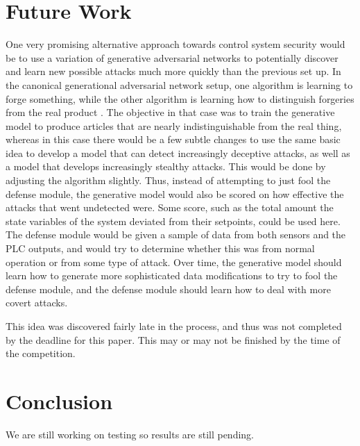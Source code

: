 \documentclass[10pt,twocolumn]{IEEEtran}
\begin{document}
\section{Future Work}\label{sec:future}
One very promising alternative approach towards control system security would be to use a variation of generative adversarial networks to potentially discover and learn new possible attacks much more quickly than the previous set up.
In the canonical generational adversarial network setup, one algorithm is learning to forge something, while the other algorithm is learning how to distinguish forgeries from the real product \cite{gan}.
The objective in that case was to train the generative model to produce articles that are nearly indistinguishable from the real thing, whereas in this case there would be a few subtle changes to use the same basic idea to develop a model that can detect increasingly deceptive attacks, as well as a model that develops increasingly stealthy attacks.
This would be done by adjusting the algorithm slightly.
Thus, instead of attempting to just fool the defense module, the generative model would also be scored on how effective the attacks that went undetected were.
Some score, such as the total amount the state variables of the system deviated from their setpoints, could be used here.
The defense module would be given a sample of data from both sensors and the PLC outputs, and would try to determine whether this was from normal operation or from some type of attack.
Over time, the generative model should learn how to generate more sophisticated data modifications to try to fool the defense module, and the defense module should learn how to deal with more covert attacks.

This idea was discovered fairly late in the process, and thus was not completed by the deadline for this paper.
This may or may not be finished by the time of the competition.

\section{Conclusion} \label{sec:conclusion}
We are still working on testing so results are still pending.

\vspace{-0.08in}
\raggedright


\end{document}
